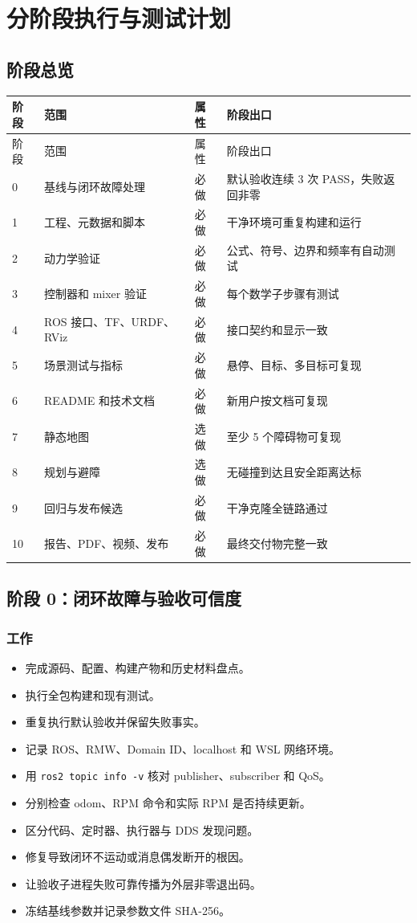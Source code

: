 \documentclass[UTF8,a4paper,12pt,fontset=fandol]{ctexart}
\newcommand{\unchecked}{\(\square\)}
\newcommand{\checked}{\(\boxtimes\)}
\newcommand{\workitem}[1]{\item[\unchecked] #1}
\newcommand{\doneitem}[1]{\item[\checked] #1}
\newcommand{\code}[1]{\texttt{#1}}
\begin{document}
\section{分阶段执行与测试计划}

\subsection{阶段总览}

\begin{longtable}{p{}p{}p{}p{}}
\toprule
阶段 & 范围 & 属性 & 阶段出口 \\
\midrule
\endfirsthead
\toprule
阶段 & 范围 & 属性 & 阶段出口 \\
\midrule
\endhead
0 & 基线与闭环故障处理 & 必做 & 默认验收连续 3 次 PASS，失败返回非零 \\
1 & 工程、元数据和脚本 & 必做 & 干净环境可重复构建和运行 \\
2 & 动力学验证 & 必做 & 公式、符号、边界和频率有自动测试 \\
3 & 控制器和 mixer 验证 & 必做 & 每个数学子步骤有测试 \\
4 & ROS 接口、TF、URDF、RViz & 必做 & 接口契约和显示一致 \\
5 & 场景测试与指标 & 必做 & 悬停、目标、多目标可复现 \\
6 & README 和技术文档 & 必做 & 新用户按文档可复现 \\
7 & 静态地图 & 选做 & 至少 5 个障碍物可复现 \\
8 & 规划与避障 & 选做 & 无碰撞到达且安全距离达标 \\
9 & 回归与发布候选 & 必做 & 干净克隆全链路通过 \\
10 & 报告、PDF、视频、发布 & 必做 & 最终交付物完整一致 \\
\bottomrule
\end{longtable}

\subsection{阶段 0：闭环故障与验收可信度}

\subsubsection{工作}
\begin{itemize}
  \doneitem{完成源码、配置、构建产物和历史材料盘点。}
  \doneitem{执行全包构建和现有测试。}
  \doneitem{重复执行默认验收并保留失败事实。}
  \workitem{记录 ROS、RMW、Domain ID、localhost 和 WSL 网络环境。}
  \workitem{用 \code{ros2 topic info -v} 核对 publisher、subscriber 和 QoS。}
  \workitem{分别检查 odom、RPM 命令和实际 RPM 是否持续更新。}
  \workitem{区分代码、定时器、执行器与 DDS 发现问题。}
  \workitem{修复导致闭环不运动或消息偶发断开的根因。}
  \workitem{让验收子进程失败可靠传播为外层非零退出码。}
  \workitem{冻结基线参数并记录参数文件 SHA-256。}
\end{itemize}
\end{document}
